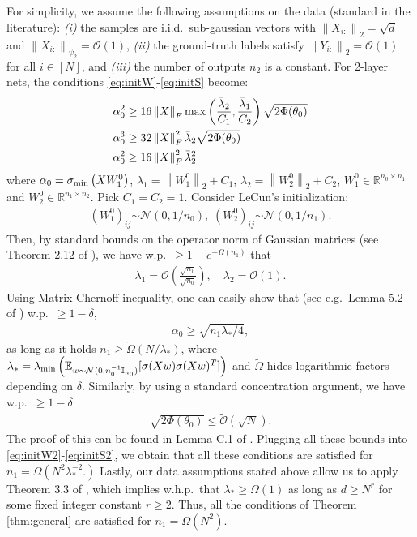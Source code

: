 \documentclass{article}
\def\RR{\mathbb{R}}
\newcommand{\E}{\mathbb{E}}
\newcommand{\distas}[1]{\mathbin{\overset{#1}{\sim}}}
\newcommand{\Id}{\mathbb{I}}
\newcommand{\norm}[1]{\left\|#1\right\|}
\newcommand{\svmin}[1]{\sigma_{\rm min}\left(#1\right)}
\newcommand{\evmin}[1]{\lambda_{\rm min}\left(#1\right)}
\def\max{\mathop{\rm max}\nolimits}
\begin{document}
For simplicity, we assume the following assumptions on the data (standard in the literature):
\emph{(i)} the samples are i.i.d.\ sub-gaussian vectors with $\norm{X_{i:}}_2=\sqrt{d}$ and $\norm{X_{i:}}_{\psi_2}=\mathcal{O}(1)$,
\emph{(ii)} the ground-truth labels satisfy $\norm{Y_{i:}}_2=\mathcal{O}(1)$ for all $i\in[N]$,
and \emph{(iii)} the number of outputs $n_2$ is a constant.
For 2-layer nets, the conditions \eqref{eq:initW}-\eqref{eq:initS} become:
    \begin{align}
	&\alpha_0^2 \geq 16\norm{X}_F \max\left(\frac{\bar{\lambda}_2}{C_1},\frac{\bar{\lambda}_1}{C_2}\right) \sqrt{2\Phi(\theta_0)} \label{eq:initW2}\\
	&\alpha_0^3 \geq 32\norm{X}_F^2 \bar{\lambda}_{2} \sqrt{2\Phi(\theta_0)} \label{eq:initF2} \\
	&\alpha_0^2 \geq 16\norm{X}_F^2 \bar{\lambda}_2^2 \label{eq:initS2} 
    \end{align}
where $\alpha_0=\svmin{XW_1^0}$, $\bar{\lambda}_1=\norm{W_1^0}_2+C_1$, $\bar{\lambda}_2=\norm{W_2^0}_2+C_2$, $W_1^0\in\RR^{n_0\times n_1}$ and $W_2^0\in\RR^{n_1\times n_2}.$
Pick $C_1=C_2=1.$
Consider LeCun's initialization: 
\begin{align}
    (W_1^0)_{ij}\distas{}\mathcal{N}(0,1/n_0),\;
    (W_2^0)_{ij}\distas{}\mathcal{N}(0,1/n_1).
\end{align}
Then, by standard bounds on the operator norm of Gaussian matrices (see Theorem 2.12 of \cite{Davidson2001}), 
we have w.p.\ $\geq 1-e^{-\Omega(n_1)}$ that
\begin{align}
    \bar{\lambda}_1=\mathcal{O}\left(\frac{\sqrt{n_1}}{\sqrt{n_0}}\right),\quad
    \bar{\lambda}_2=\mathcal{O}(1).
\end{align}
Using Matrix-Chernoff inequality, one can easily show that (see e.g.\ Lemma 5.2 of \cite{QuynhNTK2021}) w.p.\ $\geq 1-\delta$,
\begin{align}
    \alpha_0\geq\sqrt{n_1\lambda_*/4},
\end{align}
as long as it holds $n_1\geq\tilde{\Omega}(N/\lambda_*)$,  
where $\lambda_*=\evmin{\E_{w\distas{}\mathcal{N}(0,n_0^{-1}\Id_{n_0})} [\sigma(Xw)\sigma(Xw)^T]}$ 
and $\tilde{\Omega}$ hides logarithmic factors depending on $\delta$.
Similarly, by using a standard concentration argument, we have w.p.\ $\geq 1-\delta$
\begin{align}
    \sqrt{2\Phi(\theta_0)}\leq\tilde{\mathcal{O}}(\sqrt{N}) .
\end{align}
The proof of this can be found in Lemma C.1 of \cite{QuynhMarco2020}.
Plugging all these bounds into \eqref{eq:initW2}-\eqref{eq:initS2},
we obtain that all these conditions are satisfied for $n_1=\Omega(N^2\lambda_*^{-2}.)$
Lastly, our data assumptions stated above allow us to apply Theorem 3.3 of \cite{QuynhMarco2020},
which implies w.h.p.\ that $\lambda_*\geq\Omega(1)$ as long as $d\geq N^r$ for some fixed integer constant $r\geq 2.$
Thus, all the conditions of Theorem \ref{thm:general} are satisfied for $n_1=\Omega(N^2)$.
\end{document}
